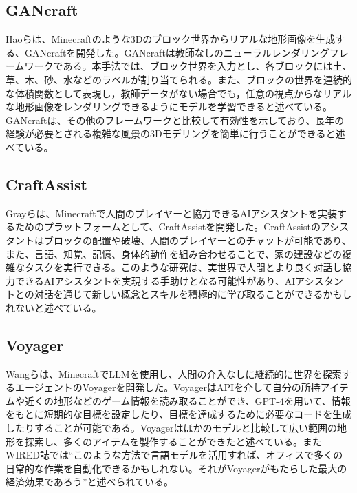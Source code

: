 \subsection{GANcraft}\label{sec:gancraft}
Haoらは、Minecraftのような3Dのブロック世界からリアルな地形画像を生成する、GANcraftを開発した。GANcraftは教師なしのニューラルレンダリングフレームワークである。本手法では、ブロック世界を入力とし、各ブロックには土、草、木、砂、水などのラベルが割り当てられる。また、ブロックの世界を連続的な体積関数として表現し，教師データがない場合でも，任意の視点からなリアルな地形画像をレンダリングできるようにモデルを学習できると述べている。GANcraftは、その他のフレームワークと比較して有効性を示しており、長年の経験が必要とされる複雑な風景の3Dモデリングを簡単に行うことができると述べている。

\subsection{CraftAssist}
Grayらは、Minecraftで人間のプレイヤーと協力できるAIアシスタントを実装するためのプラットフォームとして、CraftAssistを開発した。CraftAssistのアシスタントはブロックの配置や破壊、人間のプレイヤーとのチャットが可能であり、また、言語、知覚、記憶、身体的動作を組み合わせることで、家の建設などの複雑なタスクを実行できる。このような研究は、実世界で人間とより良く対話し協力できるAIアシスタントを実現する手助けとなる可能性があり、AIアシスタントとの対話を通じて新しい概念とスキルを積極的に学び取ることができるかもしれないと述べている。

\subsection{Voyager}
Wangらは、MinecraftでLLMを使用し、人間の介入なしに継続的に世界を探索するエージェントのVoyagerを開発した。VoyagerはAPIを介して自分の所持アイテムや近くの地形などのゲーム情報を読み取ることができ、GPT-4を用いて、情報をもとに短期的な目標を設定したり、目標を達成するために必要なコードを生成したりすることが可能である。Voyagerはほかのモデルと比較して広い範囲の地形を探索し、多くのアイテムを製作することができたと述べている。またWIRED誌では``このような方法で言語モデルを活用すれば、オフィスで多くの日常的な作業を自動化できるかもしれない。それがVoyagerがもたらした最大の経済効果であろう''と述べられている。
